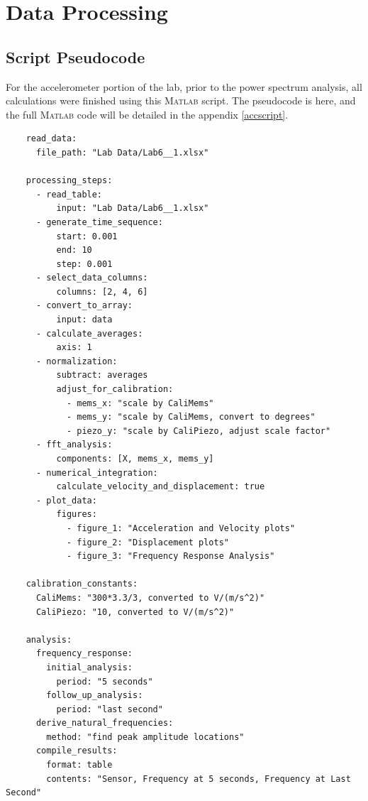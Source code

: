 \documentclass{article}
\begin{document}
\hypertarget{datapro}{}
\section{Data Processing}




\subsection{Script Pseudocode}

For the accelerometer portion of the lab, prior to the power spectrum analysis, all calculations were finished using this \textsc{Matlab} script. The pseudocode is here, and the full \textsc{Matlab} code will be detailed in the appendix \ref{accscript}.

\begin{verbatim}
    read_data:
      file_path: "Lab Data/Lab6__1.xlsx"
    
    processing_steps:
      - read_table: 
          input: "Lab Data/Lab6__1.xlsx"
      - generate_time_sequence:
          start: 0.001
          end: 10
          step: 0.001
      - select_data_columns:
          columns: [2, 4, 6]
      - convert_to_array:
          input: data
      - calculate_averages:
          axis: 1
      - normalization:
          subtract: averages
          adjust_for_calibration:
            - mems_x: "scale by CaliMems"
            - mems_y: "scale by CaliMems, convert to degrees"
            - piezo_y: "scale by CaliPiezo, adjust scale factor"
      - fft_analysis:
          components: [X, mems_x, mems_y]
      - numerical_integration:
          calculate_velocity_and_displacement: true
      - plot_data:
          figures:
            - figure_1: "Acceleration and Velocity plots"
            - figure_2: "Displacement plots"
            - figure_3: "Frequency Response Analysis"
    
    calibration_constants:
      CaliMems: "300*3.3/3, converted to V/(m/s^2)"
      CaliPiezo: "10, converted to V/(m/s^2)"
    
    analysis:
      frequency_response:
        initial_analysis:
          period: "5 seconds"
        follow_up_analysis:
          period: "last second"
      derive_natural_frequencies:
        method: "find peak amplitude locations"
      compile_results:
        format: table
        contents: "Sensor, Frequency at 5 seconds, Frequency at Last Second"
\end{verbatim}
\end{document}
